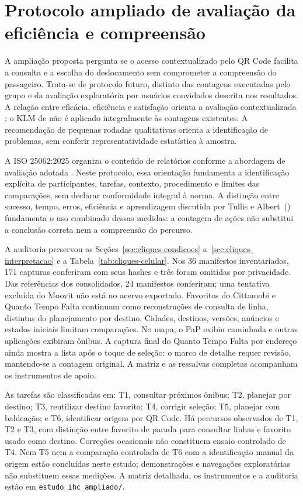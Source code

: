 \section{Protocolo ampliado de avaliação da eficiência e compreensão}
\label{sec:ihc-ampliado}
A ampliação proposta pergunta se o acesso contextualizado pelo QR Code facilita a consulta e a escolha do deslocamento sem comprometer a compreensão do passageiro. Trata-se de protocolo futuro, distinto das contagens executadas pelo grupo e da avaliação exploratória por usuários convidados descrita nos resultados. A relação entre eficácia, eficiência e satisfação orienta a avaliação contextualizada \citep{iso924111}; o KLM de \citet{card1980} não é aplicado integralmente às contagens existentes. A recomendação de pequenas rodadas qualitativas \citep{nielsen2000} orienta a identificação de problemas, sem conferir representatividade estatística à amostra.

A ISO 25062:2025 organiza o conteúdo de relatórios conforme a abordagem de avaliação adotada \citep{iso25062}. Neste protocolo, essa orientação fundamenta a identificação explícita de participantes, tarefas, contexto, procedimento e limites das comparações, sem declarar conformidade integral à norma. A distinção entre sucesso, tempo, erros, eficiência e aprendizagem discutida por Tullis e Albert~(\citeyear{tullis2013}) fundamenta o uso combinado dessas medidas: a contagem de ações não substitui a conclusão correta nem a compreensão do percurso.

A auditoria preservou as Seções~\ref{sec:cliques-condicoes} a~\ref{sec:cliques-interpretacao} e a Tabela~\ref{tab:cliques-celular}. Nos 36 manifestos inventariados, 171 capturas conferiram com seus hashes e três foram omitidas por privacidade. Das referências dos consolidados, 24 manifestos conferiram; uma tentativa excluída do Moovit não está no acervo exportado. Favoritos do Cittamobi e Quanto Tempo Falta continuam como reconstruções de consulta de linha, distintas do planejamento por destino. Cidades, destinos, versões, anúncios e estados iniciais limitam comparações. No mapa, o PaP exibiu caminhada e outras aplicações exibiram ônibus. A captura final do Quanto Tempo Falta por endereço ainda mostra a lista após o toque de seleção: o marco de detalhe requer revisão, mantendo-se a contagem original. A matriz e as ressalvas completas acompanham os instrumentos de apoio.

As tarefas são classificadas em: T1, consultar próximos ônibus; T2, planejar por destino; T3, reutilizar destino favorito; T4, corrigir seleção; T5, planejar com baldeação; e T6, identificar origem por QR Code. Há percursos observados de T1, T2 e T3, com distinção entre favorito de parada para consultar linhas e favorito usado como destino. Correções ocasionais não constituem ensaio controlado de T4. Nem T5 nem a comparação controlada de T6 com a identificação manual da origem estão concluídas neste estudo; demonstrações e navegações exploratórias não substituem essas medições. A matriz detalhada, os instrumentos e a auditoria estão em \nolinkurl{estudo_ihc_ampliado/}.

